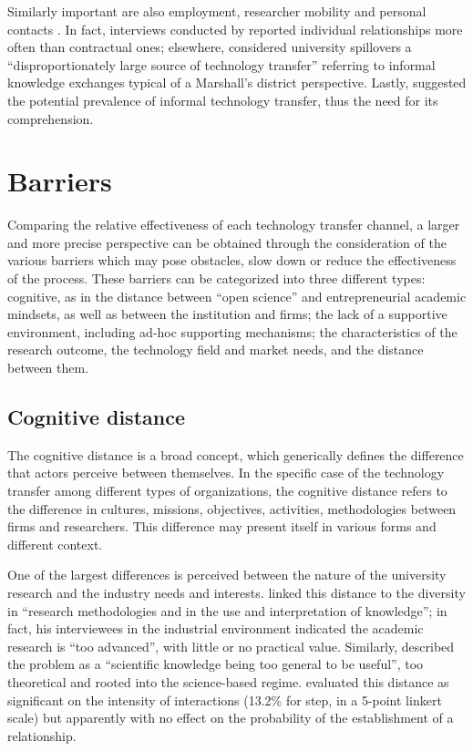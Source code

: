 Similarly important are also employment, researcher mobility and personal contacts \citep{Bekkers2008}. In fact, interviews conducted by \citet{Siegel2003a} reported individual relationships more often than contractual ones; elsewhere, \citet{Sohn2012} considered university spillovers a \enquote{disproportionately large source of technology transfer} referring to informal knowledge exchanges typical of a Marshall's district perspective. Lastly, \citet{Link2007} suggested the potential prevalence of informal technology transfer, thus the need for its comprehension. 

\section{Barriers} 

Comparing the relative effectiveness of each technology transfer channel, a larger and more precise perspective can be obtained through the consideration of the various barriers which may pose obstacles, slow down or reduce the effectiveness of the process. These barriers can be categorized into three different types: cognitive, as in the distance between \enquote{open science} and entrepreneurial academic mindsets, as well as between the institution and firms; the lack of a supportive environment, including ad-hoc supporting mechanisms; the characteristics of the research outcome, the technology field and market needs, and the distance between them.

\subsection{Cognitive distance} 

The cognitive distance is a broad concept, which generically defines the difference that actors perceive between themselves. In the specific case of the technology transfer among different types of organizations, the cognitive distance refers to the difference in cultures, missions, objectives, activities, methodologies between firms and researchers. This difference may present itself in various forms and different context.

One of the largest differences is perceived between the nature of the university research and the industry needs and interests. \citet{Muscio2008} linked this distance to the diversity in \enquote{research methodologies and in the use and interpretation of knowledge}; in fact, his interviewees in the industrial environment indicated the academic research is \enquote{too advanced}, with little or no practical value. Similarly, \citet{Gilsing2011} described the problem as a \enquote{scientific knowledge being too general to be useful}, too theoretical and rooted into the science-based regime. \citet{Muscio2013} evaluated this distance as significant on the intensity of interactions (13.2\% for step, in a 5-point linkert scale) but apparently with no effect on the probability of the establishment of a relationship.


